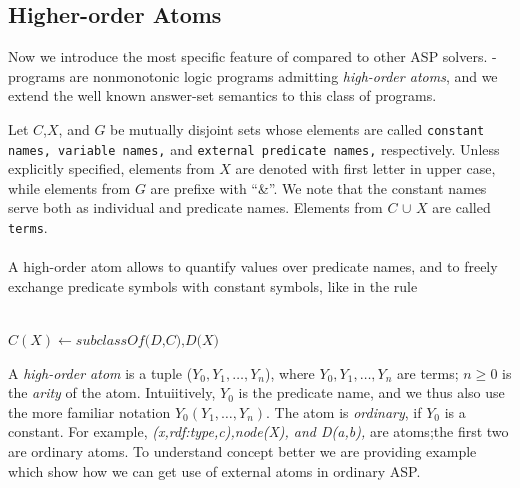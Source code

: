 \documentclass[14pt,a4paper, titlepage]{article}
\begin{document}
\subsection{Higher-order Atoms}
Now we introduce the most specific feature of \dlvhex{} compared to other ASP solvers. \hex{}-programs are nonmonotonic logic programs admitting \emph{high-order atoms}, and we extend the well known answer-set semantics to this class of programs.

Let $C$,$X$, and $G$ be mutually disjoint sets whose elements are called \texttt{constant names, variable names,} and \texttt{external predicate names,} respectively. Unless explicitly specified, elements from \texttt{$X$} are denoted with first letter in upper case, while elements from \texttt{$G$} are prefixe with \enquote{\&}. 
We note that the constant names serve both as individual and predicate names. Elements from \texttt{$C$} $\cup$ \texttt{$X$} are called \texttt{terms}. \\ \\A high-order atom allows to quantify values over predicate names, and to freely exchange predicate symbols with constant symbols, like in the rule\\ \centerline{\\$C(X) \leftarrow \textit{subclassOf(D,C),D(X)}$}
A \textit{high-order atom} is a tuple ($Y_0, Y_1,\dots,Y_n$), where $Y_0, Y_1,\dots,Y_n$ are terms; $ n \ge 0$ is the \textit{arity} of the atom. Intuiitively, $Y_0$ is the predicate name, and we thus also use the more familiar notation $Y_0(Y_1,\dots,Y_n)$. The atom is \textit{ordinary}, if $Y_0$ is a constant. For example, \textit{(x,rdf:type,c),node(X), and D(a,b),} are atoms;the first two are ordinary atoms. To understand concept better we are providing example which show how we can get use of external atoms in ordinary ASP.
\end{document}

